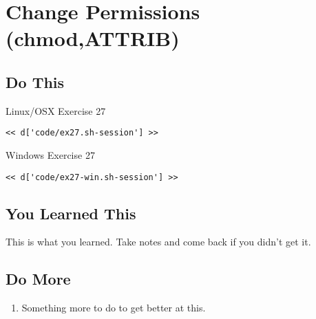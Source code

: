 \chapter{Change Permissions (chmod,ATTRIB)}

\section{Do This}

\begin{code}{Linux/OSX Exercise 27}
\begin{Verbatim}
<< d['code/ex27.sh-session'] >>
\end{Verbatim}
\end{code}

\begin{code}{Windows Exercise 27}
\begin{Verbatim}
<< d['code/ex27-win.sh-session'] >>
\end{Verbatim}
\end{code}

\section{You Learned This}

This is what you learned.  Take notes and come back if you didn't get it.

\section{Do More}

\begin{enumerate}
\item Something more to do to get better at this.
\end{enumerate}

